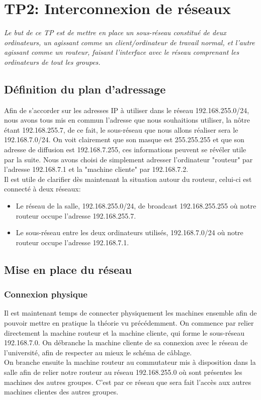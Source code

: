\chapter{TP2: Interconnexion de réseaux}
\textit{Le but de ce TP est de mettre en place un sous-réseau constitué de deux ordinateurs, un agissant comme un client/ordinateur de travail normal, et l'autre agissant comme un routeur, faisant l'interface avec le réseau comprenant les ordinateurs de tout les groupes.}

\section{Définition du plan d'adressage}
Afin de s'accorder sur les adresses IP à utiliser dans le réseau 192.168.255.0/24, nous avons tous mis en commun l'adresse que nous souhaitions utiliser, la nôtre étant 192.168.255.7, de ce fait, le sous-réseau que nous allons réaliser sera le 192.168.7.0/24.
On voit clairement que son masque est 255.255.255 et que son adresse de diffusion est 192.168.7.255, ces informations peuvent se révéler utile par la suite. Nous avons choisi de simplement adresser l'ordinateur "routeur" par l'adresse 192.168.7.1 et la "machine cliente" par 192.168.7.2.\\
Il est utile de clarifier dès maintenant la situation autour du routeur, celui-ci est connecté à deux réseaux:
\begin{itemize}
\item Le réseau de la salle, 192.168.255.0/24, de broadcast 192.168.255.255 où notre routeur occupe l'adresse 192.168.255.7.
\item Le sous-réseau entre les deux ordinateurs utilisés, 192.168.7.0/24 où notre routeur occupe l'adresse 192.168.7.1.
\end{itemize}

\section{Mise en place du réseau}
\subsection{Connexion physique}
Il est maintenant temps de connecter physiquement les machines ensemble afin de pouvoir mettre en pratique la théorie vu précédemment.
On commence par relier directement la machine routeur et la machine cliente, qui forme le sous-réseau 192.168.7.0. On débranche la machine cliente de sa connexion avec le réseau de l'université, afin de respecter au mieux le schéma de câblage.\\
On branche ensuite la machine routeur au commutateur mis à disposition dans la salle afin de relier notre routeur au réseau 192.168.255.0 où sont présentes les machines des autres groupes. C'est par ce réseau que sera fait l'accès aux autres machines clientes des autres groupes.\\

